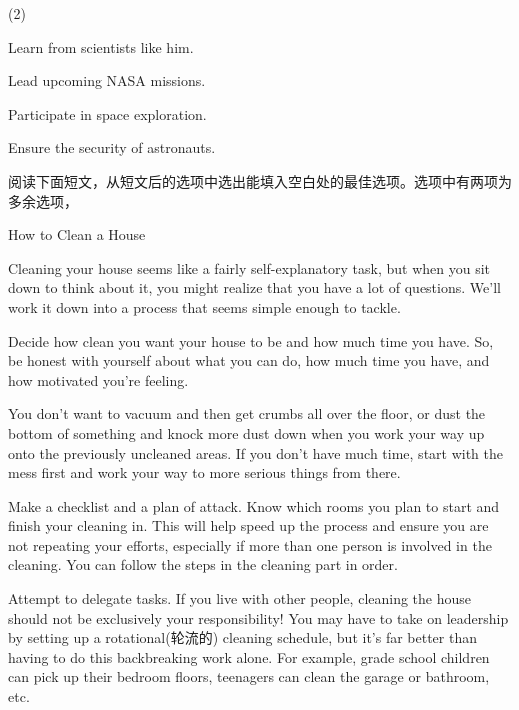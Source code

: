 \documentclass{英语试卷}
\begin{document}
\begin{choices}(2)
  \item Learn from scientists like him.
  \item Lead upcoming NASA missions.
  \item Participate in space exploration.
  \item Ensure the security of astronauts.
\end{choices}
\par 阅读下面短文，从短文后的选项中选出能填入空白处的最佳选项。选项中有两项为多余选项，\par
\par How to Clean a House\par
\par Cleaning your house seems like a fairly self-explanatory task, but when you sit down to think about it, you might realize that you have a lot of questions.  We'll work it down into a process that seems simple enough to tackle.\par
\par Decide how clean you want your house to be and how much time you have.  So, be honest with yourself about what you can do, how much time you have, and how motivated you're feeling.\par
\par {} You don't want to vacuum and then get crumbs all over the floor, or dust the bottom of something and knock more dust down when you work your way up onto the previously uncleaned areas. If you don't have much time, start with the mess first and work your way to more serious things from there.\par
\par Make a checklist and a plan of attack. Know which rooms you plan to start and finish your cleaning in. This will help speed up the process and ensure you are not repeating your efforts, especially if more than one person is involved in the cleaning. You can follow the steps in the cleaning part in order. \par
\par Attempt to delegate tasks. If you live with other people, cleaning the house should not be exclusively your responsibility! You may have to take on leadership by setting up a rotational(轮流的) cleaning schedule, but it's far better than having to do this backbreaking work alone.  For example, grade school children can pick up their bedroom floors, teenagers can clean the garage or bathroom, etc.\par
\end{document}
